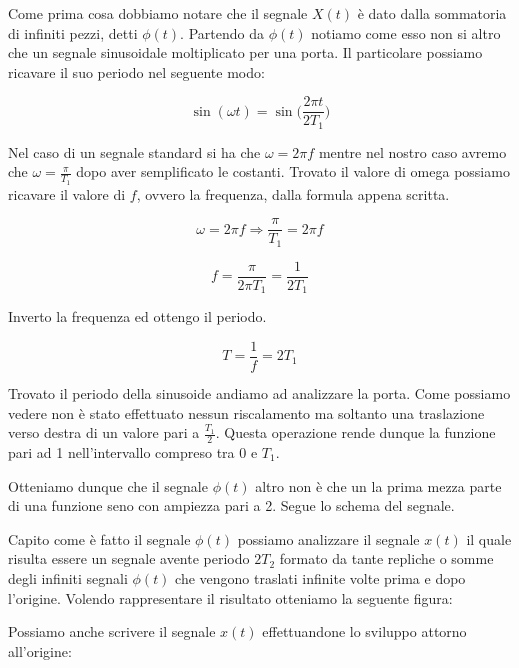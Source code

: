 \documentclass[../main.tex]{subfiles}
\begin{document}
Come prima cosa dobbiamo notare che il segnale $X(t)$ è dato dalla sommatoria di infiniti pezzi, detti $\phi(t)$.
Partendo da  $\phi(t)$ notiamo come esso non si altro che un segnale sinusoidale moltiplicato per una porta. Il particolare possiamo ricavare il suo periodo nel seguente modo:

\begin{equation}
	\sin(\omega t) = \sin\bigg(\frac{2\pi t}{2T_1}\bigg) 
\end{equation}

Nel caso di un segnale standard si ha che $\omega = 2\pi f$ mentre nel nostro caso avremo che $\omega = \frac{\pi}{T_1}$ dopo aver semplificato le costanti. Trovato il valore di omega possiamo ricavare il valore di $f$, ovvero la frequenza, dalla formula appena scritta.

\begin{equation}
	\omega = 2\pi f \Rightarrow \frac{\pi}{T_1} = 2\pi f
\end{equation}

\begin{equation}
	f = \frac{\pi}{2\pi T_1} = \frac{1}{2T_1}
\end{equation}

Inverto la frequenza ed ottengo il periodo.

\begin{equation}
	T = \frac{1}{f} = 2T_1	
\end{equation}

Trovato il periodo della sinusoide andiamo ad analizzare la porta. Come possiamo vedere non è stato effettuato nessun riscalamento ma soltanto una traslazione verso destra di un valore pari a $\frac{T_1}{2}$. Questa operazione rende dunque la funzione pari ad 1 nell'intervallo compreso tra 0 e $T_1$.

Otteniamo dunque che il segnale $\phi(t)$ altro non è che un la prima mezza parte di una funzione seno con ampiezza pari a 2. Segue lo schema del segnale.


Capito come è fatto il segnale $\phi(t)$ possiamo analizzare il segnale $x(t)$ il quale risulta essere un segnale avente periodo $2T_2$ formato da tante repliche o somme degli infiniti segnali $\phi(t)$ che vengono traslati infinite volte prima e dopo l'origine.
Volendo rappresentare il risultato otteniamo la seguente figura:


Possiamo anche scrivere il segnale $x(t)$ effettuandone lo sviluppo attorno all'origine:
\end{document}
